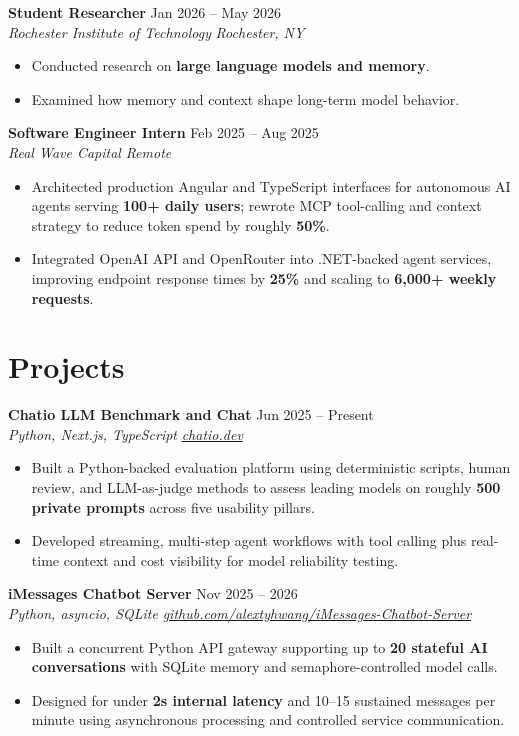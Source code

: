 \documentclass[10pt,letterpaper]{article}
\newif\ifresumeFirstRole
\newcommand{\resumeRole}[4]{%
  \ifresumeFirstRole
    \global\resumeFirstRolefalse
  \else
    \vspace{0pt plus 1fill}%
  \fi
  \textbf{#1} \hfill #2\\
  \textit{#3} \hfill \textit{#4}
}
\begin{document}
\resumeRole{Student Researcher}{Jan 2026 -- May 2026}{Rochester Institute of Technology}{Rochester, NY}
\begin{itemize}
  \item Conducted research on \textbf{large language models and memory}.
  \item Examined how memory and context shape long-term model behavior.
\end{itemize}

\resumeRole{Software Engineer Intern}{Feb 2025 -- Aug 2025}{Real Wave Capital}{Remote}
\begin{itemize}
  \item Architected production Angular and TypeScript interfaces for autonomous AI agents serving \textbf{100+ daily users}; rewrote MCP tool-calling and context strategy to reduce token spend by roughly \textbf{50\%}.
  \item Integrated OpenAI API and OpenRouter into .NET-backed agent services, improving endpoint response times by \textbf{25\%} and scaling to \textbf{6,000+ weekly requests}.
\end{itemize}

\section*{Projects}
\resumeRole{Chatio LLM Benchmark and Chat}{Jun 2025 -- Present}{Python, Next.js, TypeScript}{\href{https://chatio.dev}{chatio.dev}}
\begin{itemize}
  \item Built a Python-backed evaluation platform using deterministic scripts, human review, and LLM-as-judge methods to assess leading models on roughly \textbf{500 private prompts} across five usability pillars.
  \item Developed streaming, multi-step agent workflows with tool calling plus real-time context and cost visibility for model reliability testing.
\end{itemize}

\resumeRole{iMessages Chatbot Server}{Nov 2025 -- 2026}{Python, asyncio, SQLite}{\href{https://github.com/alextyhwang/iMessages-Chatbot-Server}{github.com/alextyhwang/iMessages-Chatbot-Server}}
\begin{itemize}
  \item Built a concurrent Python API gateway supporting up to \textbf{20 stateful AI conversations} with SQLite memory and semaphore-controlled model calls.
  \item Designed for under \textbf{2s internal latency} and 10--15 sustained messages per minute using asynchronous processing and controlled service communication.
\end{itemize}
\end{document}
